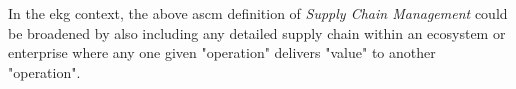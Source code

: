 %
%
In the \gls{ekg} context, the above \gls{ascm} definition of \textit{Supply Chain Management} could be broadened
by also including any detailed supply chain within an ecosystem or enterprise where any one given "operation"
delivers "value" to another "operation".

